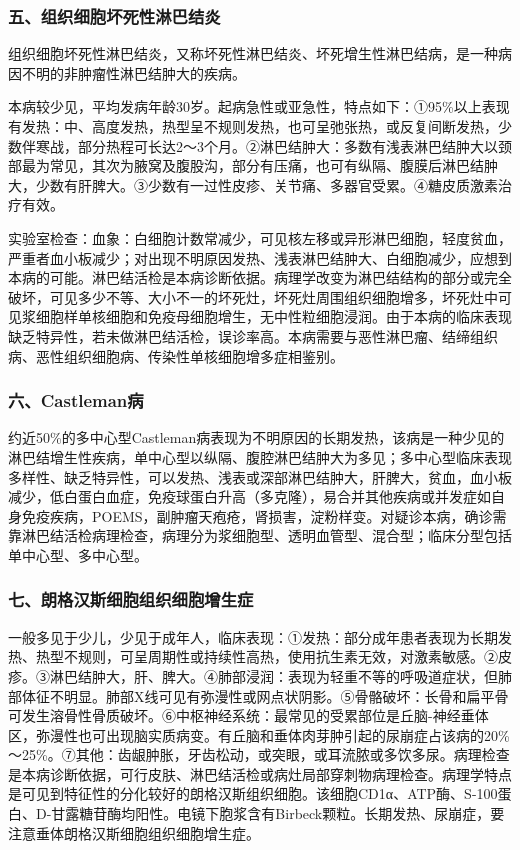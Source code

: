 \subsubsection{五、组织细胞坏死性淋巴结炎}

组织细胞坏死性淋巴结炎，又称坏死性淋巴结炎、坏死增生性淋巴结病，是一种病因不明的非肿瘤性淋巴结肿大的疾病。

本病较少见，平均发病年龄30岁。起病急性或亚急性，特点如下：①95\%以上表现有发热：中、高度发热，热型呈不规则发热，也可呈弛张热，或反复间断发热，少数伴寒战，部分热程可长达2～3个月。②淋巴结肿大：多数有浅表淋巴结肿大以颈部最为常见，其次为腋窝及腹股沟，部分有压痛，也可有纵隔、腹膜后淋巴结肿大，少数有肝脾大。③少数有一过性皮疹、关节痛、多器官受累。④糖皮质激素治疗有效。

实验室检查：血象：白细胞计数常减少，可见核左移或异形淋巴细胞，轻度贫血，严重者血小板减少；对出现不明原因发热、浅表淋巴结肿大、白细胞减少，应想到本病的可能。淋巴结活检是本病诊断依据。病理学改变为淋巴结结构的部分或完全破坏，可见多少不等、大小不一的坏死灶，坏死灶周围组织细胞增多，坏死灶中可见浆细胞样单核细胞和免疫母细胞增生，无中性粒细胞浸润。由于本病的临床表现缺乏特异性，若未做淋巴结活检，误诊率高。本病需要与恶性淋巴瘤、结缔组织病、恶性组织细胞病、传染性单核细胞增多症相鉴别。

\subsubsection{六、Castleman病}

约近50\%的多中心型Castleman病表现为不明原因的长期发热，该病是一种少见的淋巴结增生性疾病，单中心型以纵隔、腹腔淋巴结肿大为多见；多中心型临床表现多样性、缺乏特异性，可以发热、浅表或深部淋巴结肿大，肝脾大，贫血，血小板减少，低白蛋白血症，免疫球蛋白升高（多克隆），易合并其他疾病或并发症如自身免疫疾病，POEMS，副肿瘤天疱疮，肾损害，淀粉样变。对疑诊本病，确诊需靠淋巴结活检病理检查，病理分为浆细胞型、透明血管型、混合型；临床分型包括单中心型、多中心型。

\subsubsection{七、朗格汉斯细胞组织细胞增生症}

一般多见于少儿，少见于成年人，临床表现：①发热：部分成年患者表现为长期发热、热型不规则，可呈周期性或持续性高热，使用抗生素无效，对激素敏感。②皮疹。③淋巴结肿大，肝、脾大。④肺部浸润：表现为轻重不等的呼吸道症状，但肺部体征不明显。肺部X线可见有弥漫性或网点状阴影。⑤骨骼破坏：长骨和扁平骨可发生溶骨性骨质破坏。⑥中枢神经系统：最常见的受累部位是丘脑-神经垂体区，弥漫性也可出现脑实质病变。有丘脑和垂体肉芽肿引起的尿崩症占该病的20\%～25\%。⑦其他：齿龈肿胀，牙齿松动，或突眼，或耳流脓或多饮多尿。病理检查是本病诊断依据，可行皮肤、淋巴结活检或病灶局部穿刺物病理检查。病理学特点是可见到特征性的分化较好的朗格汉斯组织细胞。该细胞CD1α、ATP酶、S-100蛋白、D-甘露糖苷酶均阳性。电镜下胞浆含有Birbeck颗粒。长期发热、尿崩症，要注意垂体朗格汉斯细胞组织细胞增生症。

